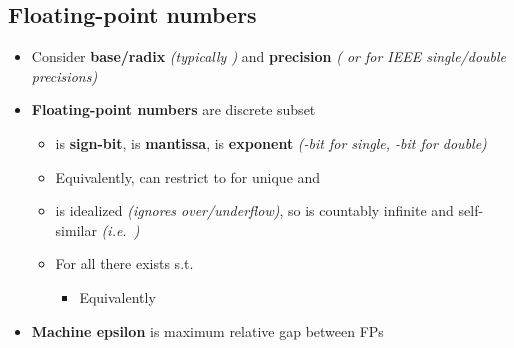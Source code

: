 \subsection*{Floating-point numbers}

\begin{itemize}

\item
  Consider \textbf{base/radix}  \emph{(typically
  )} and \textbf{precision}  \emph{(
  or  for IEEE single/double precisions)}
\item
  \textbf{Floating-point numbers} are discrete subset

  \begin{itemize}
  
  \item
     is \textbf{sign-bit},  is
    \textbf{mantissa},  is \textbf{exponent}
    \emph{(-bit for single, -bit for double)}
  \item
    Equivalently, can restrict to
     for unique  and
  \item
     is idealized \emph{(ignores
    over/underflow)}, so is countably infinite and self-similar
    \emph{(i.e.~)}
  \item
    For all  there exists
     s.t.

    \begin{itemize}
    
    \item
      Equivalently
    \end{itemize}
  \end{itemize}
\item
  \textbf{Machine epsilon}
  is maximum relative gap between FPs

  \begin{itemize}
  

\end{itemize}
\end{itemize}

